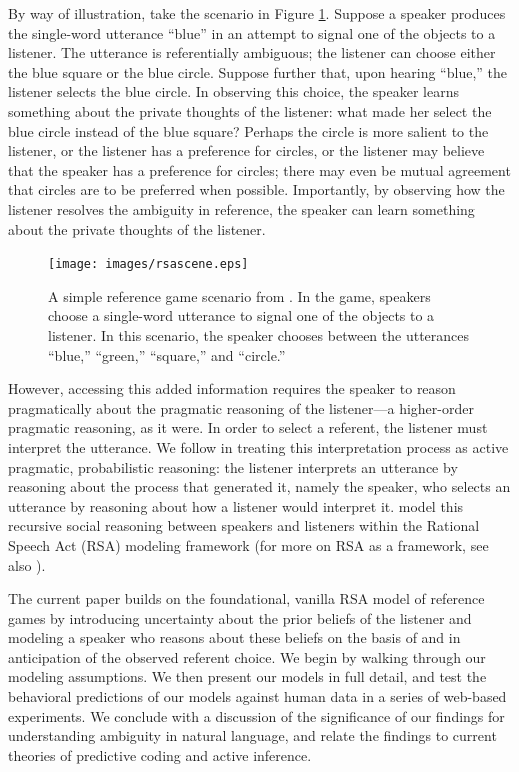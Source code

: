 \documentclass[10pt,a4paper]{article}
\begin{document}
By way of illustration, take the scenario in Figure \ref{FG-ref-game}. Suppose a speaker produces the single-word utterance ``blue'' in an attempt to signal one of the objects to a listener. The utterance is referentially ambiguous; the listener can choose either the blue square or the blue circle. Suppose further that, upon hearing ``blue,'' the listener selects the blue circle. In observing this choice, the speaker learns something about the private thoughts of the listener: what made her select the blue circle instead of the blue square? Perhaps the circle is more salient to the listener, or the listener has a preference for circles, or the listener may believe that the speaker has a preference for circles; there may even be mutual agreement that circles are to be preferred when possible. Importantly, by observing how the listener resolves the ambiguity in reference, the speaker can learn something about the private thoughts of the listener. 

\begin{figure}
	\centering
	\texttt{[image: images/rsascene.eps]}
	\caption{A simple reference game scenario from \protect{}. In the game, speakers choose a single-word utterance to signal one of the objects to a listener. In this scenario, the speaker chooses between the utterances ``blue,'' ``green,'' ``square,'' and ``circle.''}
	\label{FG-ref-game}
\end{figure}

However, accessing this added information requires the speaker to reason pragmatically about the pragmatic reasoning of the listener---a higher-order pragmatic reasoning, as it were. In order to select a referent, the listener must interpret the utterance. We follow  in treating this interpretation process as active pragmatic, probabilistic reasoning: the listener interprets an utterance by reasoning about the process that generated it, namely the speaker, who selects an utterance by reasoning about how a listener would interpret it. \citeauthor{frankgoodman2012} model this recursive social reasoning between speakers and listeners within the Rational Speech Act (RSA) modeling framework (for more on RSA as a framework, see also ).

The current paper builds on the foundational, vanilla RSA model of reference games by introducing uncertainty about the prior beliefs of the listener and modeling a speaker who reasons about these beliefs on the basis of and in anticipation of the observed referent choice. 
We begin by walking through our modeling assumptions. 
We then present our models in full detail, and test the behavioral predictions of our models against human data in a series of web-based experiments.
We conclude with a discussion of the significance of our findings for understanding ambiguity in natural language, and relate the findings to current theories of predictive coding and active inference.
\end{document}
